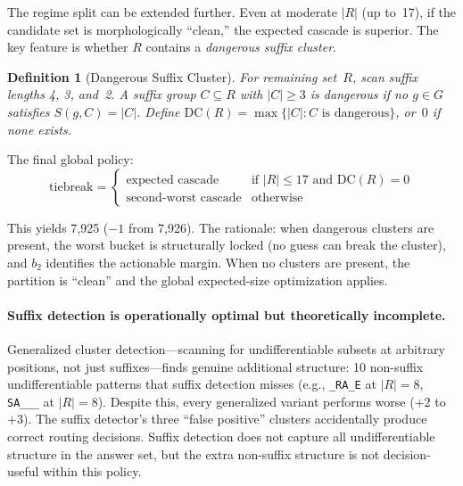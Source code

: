 \documentclass[11pt]{article}
\newtheorem{definition}{Definition}
\begin{document}
	The regime split can be extended further.  Even at moderate $|R|$ (up to~17), if the candidate set is morphologically ``clean,'' the expected cascade is superior.  The key feature is whether $R$ contains a \emph{dangerous suffix cluster}.
	
	\begin{definition}[Dangerous Suffix Cluster]\label{def:cluster}
		For remaining set~$R$, scan suffix lengths 4, 3, and~2.  A suffix group $C \subseteq R$ with $|C| \geq 3$ is \emph{dangerous} if no $g \in G$ satisfies $S(g,C) = |C|$.  Define $\mathrm{DC}(R) = \max\{|C| : C \text{ is dangerous}\}$, or~$0$ if none exists.
	\end{definition}
	
	The final global policy:
	\begin{equation}\label{eq:policy}
		\text{tiebreak} = \begin{cases}
			\text{expected cascade} & \text{if } |R| \leq 17 \text{ and } \mathrm{DC}(R) = 0 \\
			\text{second-worst cascade} & \text{otherwise}
		\end{cases}
	\end{equation}
	
	This yields 7,925 ($-1$ from 7,926).  The rationale: when dangerous clusters are present, the worst bucket is structurally locked (no guess can break the cluster), and $b_2$ identifies the actionable margin.  When no clusters are present, the partition is ``clean'' and the global expected-size optimization applies.
	
	\paragraph{Suffix detection is operationally optimal but theoretically incomplete.}
	Generalized cluster detection---scanning for undifferentiable subsets at arbitrary positions, not just suffixes---finds genuine additional structure: 10 non-suffix undifferentiable patterns that suffix detection misses (e.g., \texttt{\_RA\_E} at $|R| = 8$, \texttt{SA\_\_\_} at $|R| = 8$).  Despite this, every generalized variant performs worse ($+2$ to $+3$).  The suffix detector's three ``false positive'' clusters accidentally produce correct routing decisions.  Suffix detection does not capture all undifferentiable structure in the answer set, but the extra non-suffix structure is not decision-useful within this policy.
	
\end{document}
